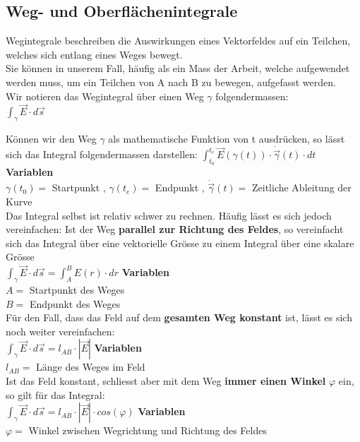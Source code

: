 \newpage
\subsection{Weg- und Oberflächenintegrale}

\begingl
Wegintegrale beschreiben die Auswirkungen eines Vektorfeldes auf ein Teilchen, welches sich entlang eines Weges bewegt. \\
Sie können in unserem Fall, häufig als ein Mass der Arbeit, welche aufgewendet werden muss, um ein Teilchen von A nach B zu bewegen, aufgefasst werden. \\

Wir notieren das Wegintegral über einen Weg $\gamma$ folgendermassen: \\
\formulaBegin
$ \displaystyle \int_\gamma \vec{E} \cdot d\vec{s}$
\formulaEnd

Können wir den Weg $\gamma$ als mathematische Funktion von t ausdrücken, so lässt sich das Integral folgendermassen darstellen:
\formulaBegin
$\displaystyle \int_{t_0}^{t_e} \vec{E}(\gamma(t)) \cdot \dot{\vec{\gamma}}(t) \cdot dt$
\formulaEnd
\textbf{Variablen} \\
$\gamma(t_0) = $ Startpunkt ,  $\gamma(t_e) = $ Endpunkt , $ \dot{\vec{\gamma}}(t) = $ Zeitliche Ableitung der Kurve \\


Das Integral selbst ist relativ schwer zu rechnen. Häufig lässt es sich jedoch vereinfachen:
Ist der Weg \textbf{parallel zur Richtung des Feldes}, so vereinfacht sich das Integral über eine vektorielle Grösse zu einem Integral über eine skalare Grösse \\
\formulaBegin
$\displaystyle \int_\gamma \vec{E} \cdot d\vec{s} = \int_A^B E(r) \cdot dr $
\formulaEnd
\textbf{Variablen} \\
$ A  = $ Startpunkt des Weges\\
$ B = $ Endpunkt des Weges \\

Für den Fall, dass das Feld auf dem \textbf{gesamten Weg konstant} ist, lässt es sich noch weiter vereinfachen: \\
\formulaBegin
$\displaystyle \int_\gamma \vec{E} \cdot d\vec{s} = l_{AB} \cdot |\vec{E}|$
\formulaEnd
\textbf{Variablen} \\
$ l_{AB}  = $ Länge des Weges im Feld\\
Ist das Feld konstant, schliesst aber mit dem Weg \textbf{immer einen Winkel} $\varphi$ ein, so gilt für das Integral: \\
\formulaBegin
$\displaystyle \int_\gamma \vec{E} \cdot d\vec{s} = l_{AB} \cdot |\vec{E}|\cdot cos(\varphi)$
\formulaEnd
\textbf{Variablen} \\
$ \varphi  = $  Winkel zwischen Wegrichtung und Richtung des Feldes\\

